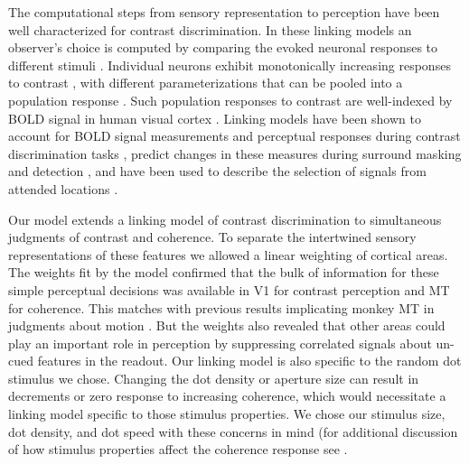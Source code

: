 The computational steps from sensory representation to perception have been well characterized for contrast discrimination. In these linking models an observer’s choice is computed by comparing the evoked neuronal responses to different stimuli \citep{Boynton1999-jd,Foley1981-aw,Ling2006-zx,Nachmias1974-vz,Pestilli2009-xu}. Individual neurons exhibit monotonically increasing responses to contrast \citep{Albrecht1982-rq}, with different parameterizations \citep{Tolhurst1983-cv} that can be pooled into a population response \citep{Shadlen1996-pr}. Such population responses to contrast are well-indexed by BOLD signal in human visual cortex \citep{Avidan2002-jg,Boynton1996-ff,Boynton1999-jd,Gardner2005-pg,Heeger2000-pq,Logothetis2001-kk}. Linking models have been shown to account for BOLD signal measurements and perceptual responses during contrast discrimination tasks \citep{Boynton1999-jd}, predict changes in these measures during surround masking \citep{Zenger-Landolt2003-kq} and detection \citep{Ress2000-pa}, and have been used to describe the selection of signals from attended locations \citep{Hara2014-mv,Pestilli2011-gi}. 

Our model extends a linking model of contrast discrimination \citep{Boynton1999-jd} to simultaneous judgments of contrast and coherence. To separate the intertwined sensory representations of these features we allowed a linear weighting of cortical areas. The weights fit by the model confirmed that the bulk of information for these simple perceptual decisions was available in V1 for contrast perception and MT for coherence. This matches with previous results implicating monkey MT in judgments about motion \citep{Britten1996-ik,Katz2016-xc,Newsome1988-os}. But the weights also revealed that other areas could play an important role in perception by suppressing correlated signals about un-cued features in the readout. Our linking model is also specific to the random dot stimulus we chose. Changing the dot density \citep{Smith2006-cb} or aperture size \citep{Ajina2015-xm,Becker2008-uj,Costagli2014-kg} can result in decrements or zero response to increasing coherence, which would necessitate a linking model specific to those stimulus properties. We chose our stimulus size, dot density, and dot speed with these concerns in mind (for additional discussion of how stimulus properties affect the coherence response see \citet{Birman2018-sp}.  

